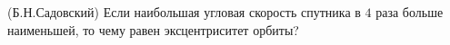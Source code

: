 (Б.Н.Садовский)
Если наибольшая угловая скорость спутника в $4$ раза больше наименьшей,
то чему равен эксцентриситет орбиты?
